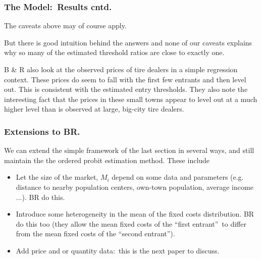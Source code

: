 \begin{frame}%

\frametitle{The Model:\ Results cntd.}

The caveats above may of course apply.

\bigskip

But there is good intuition behind the answers and none of our caveats
explains why so many of the estimated threshold ratios are close to exactly
one.

\bigskip

B \& R also look at the observed prices of tire dealers in a simple
regression context. These prices do seem to fall with the first few entrants
and then level out. This is consistent with the estimated entry thresholds.
They also note the interesting fact that the prices in these small towns
appear to level out at a much higher level than is observed at large,
big-city tire dealers.

\end{frame}%

\begin{frame}%

\frametitle{Extensions to BR.}

We can extend the simple framework of the last section in several ways, and
still maintain the the ordered probit estimation method. These include

\begin{itemize}
\item Let the size of the market, $M_{i}$ depend on some data and parameters
(e.g. distance to nearby population centers, own-town population, average
income ...). BR do this.

\item Introduce some heterogeneity in the mean of the fixed costs
distribution. BR do this too (they allow the mean fixed costs of the
\textquotedblleft first entrant\textquotedblright\ to differ from the mean
fixed costs of the \textquotedblleft second entrant\textquotedblright ).

\item Add price and or quantity data:\ this is the next paper to discuss.
\end{itemize}

\end{frame}%

